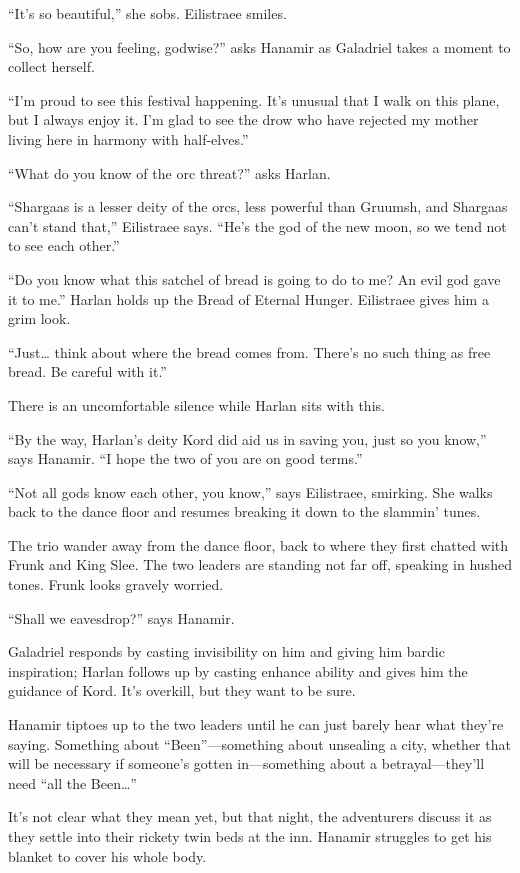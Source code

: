\documentclass[smalldemyvopaper,11pt,twoside,onecolumn,openright,extrafontsizes]{memoir}
\newlength\drop
\begin{document}
``It's so beautiful,'' she sobs. Eilistraee smiles.

``So, how are you feeling, godwise?'' asks Hanamir as Galadriel takes a
moment to collect herself.

``I'm proud to see this festival happening. It's unusual that I walk on
this plane, but I always enjoy it. I'm glad to see the drow who have
rejected my mother living here in harmony with half-elves.''

``What do you know of the orc threat?'' asks Harlan.

``Shargaas is a lesser deity of the orcs, less powerful than Gruumsh,
and Shargaas can't stand that,'' Eilistraee says. ``He's the god of the
new moon, so we tend not to see each other.''

``Do you know what this satchel of bread is going to do to me? An evil
god gave it to me.'' Harlan holds up the Bread of Eternal Hunger.
Eilistraee gives him a grim look.

``Just\ldots{} think about where the bread comes from. There's no such
thing as free bread. Be careful with it.''

There is an uncomfortable silence while Harlan sits with this.

``By the way, Harlan's deity Kord did aid us in saving you, just so you
know,'' says Hanamir. ``I hope the two of you are on good terms.''

``Not all gods know each other, you know,'' says Eilistraee, smirking.
She walks back to the dance floor and resumes breaking it down to the
slammin' tunes.

The trio wander away from the dance floor, back to where they first
chatted with Frunk and King Slee. The two leaders are standing not far
off, speaking in hushed tones. Frunk looks gravely worried.

``Shall we eavesdrop?'' says Hanamir.

Galadriel responds by casting invisibility on him and giving him bardic
inspiration; Harlan follows up by casting enhance ability and gives him
the guidance of Kord. It's overkill, but they want to be sure.

Hanamir tiptoes up to the two leaders until he can just barely hear what
they're saying. Something about ``Been''---something about unsealing a
city, whether that will be necessary if someone's gotten in---something
about a betrayal---they'll need ``all the Been\ldots{}''

It's not clear what they mean yet, but that night, the adventurers
discuss it as they settle into their rickety twin beds at the inn.
Hanamir struggles to get his blanket to cover his whole body.
\end{document}
